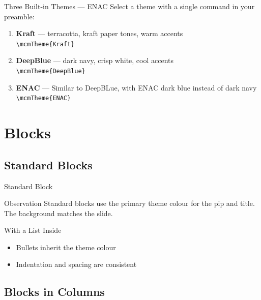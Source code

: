 \documentclass[aspectratio=169]{beamer}
\begin{document}
{
\begin{frame}{Three Built-in Themes — ENAC}
  Select a theme with a single command in your preamble:
  \begin{enumerate}
    \item {\color{mcmBlack!30}%
      \textbf{Kraft} — terracotta, kraft paper tones, warm accents\\
      \texttt{\textbackslash mcmTheme\{Kraft\}}}
    \item {\color{mcmBlack!30}%
      \textbf{DeepBlue} — dark navy, crisp white, cool accents\\
      \texttt{\textbackslash mcmTheme\{DeepBlue\}}}
    \item \textbf{ENAC} — Similar to DeepBLue, with ENAC dark blue instead of dark navy\\
      \texttt{\textbackslash mcmTheme\{ENAC\}}
  \end{enumerate}
\end{frame}
}
\section{Blocks}

\subsection{Standard Blocks}

\begin{frame}{Standard Block}
  \begin{block}{Observation}
    Standard blocks use the primary theme colour for the pip
    and title. The background matches the slide.
  \end{block}

  \begin{block}{With a List Inside}
    \begin{itemize}
      \item Bullets inherit the theme colour
      \item Indentation and spacing are consistent
    \end{itemize}
  \end{block}
\end{frame}



\subsection{Blocks in Columns}
\end{document}
